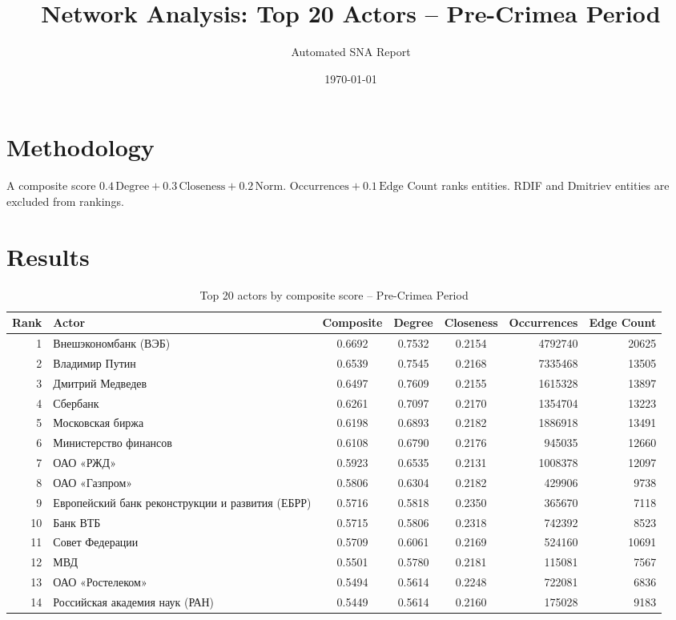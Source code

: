 \documentclass[11pt,a4paper]{article}
\title{Network Analysis: Top 20 Actors -- Pre-Crimea Period}
\author{Automated SNA Report}
\date{\today}
\begin{document}
\maketitle
\section{Methodology}
A composite score $0.4\,\text{Degree}+0.3\,\text{Closeness}+0.2\,\text{Norm.\ Occurrences}+0.1\,\text{Edge Count}$ ranks entities. RDIF and Dmitriev entities are excluded from rankings.
\section{Results}
\begin{table}[htbp]
\centering
\caption{Top 20 actors by composite score -- Pre-Crimea Period}
\label{tab:top20}
\begin{tabular}{r l S[table-format=1.4] S[table-format=1.4] S[table-format=1.4] r r}
\toprule
Rank & Actor & {Composite} & {Degree} & {Closeness} & Occurrences & {Edge Count}\\
 & Внешэкономбанк (ВЭБ) & 0.6692 & 0.7532 & 0.2154 & 4792740 & 20625 \\
2 & Владимир Путин & 0.6539 & 0.7545 & 0.2168 & 7335468 & 13505 \\
3 & Дмитрий Медведев & 0.6497 & 0.7609 & 0.2155 & 1615328 & 13897 \\
4 & Сбербанк & 0.6261 & 0.7097 & 0.2170 & 1354704 & 13223 \\
5 & Московская биржа & 0.6198 & 0.6893 & 0.2182 & 1886918 & 13491 \\
6 & Министерство финансов & 0.6108 & 0.6790 & 0.2176 & 945035 & 12660 \\
7 & ОАО «РЖД» & 0.5923 & 0.6535 & 0.2131 & 1008378 & 12097 \\
8 & ОАО «Газпром» & 0.5806 & 0.6304 & 0.2182 & 429906 & 9738 \\
9 & Европейский банк реконструкции и развития (ЕБРР) & 0.5716 & 0.5818 & 0.2350 & 365670 & 7118 \\
10 & Банк ВТБ & 0.5715 & 0.5806 & 0.2318 & 742392 & 8523 \\
11 & Совет Федерации & 0.5709 & 0.6061 & 0.2169 & 524160 & 10691 \\
12 & МВД & 0.5501 & 0.5780 & 0.2181 & 115081 & 7567 \\
13 & ОАО «Ростелеком» & 0.5494 & 0.5614 & 0.2248 & 722081 & 6836 \\
14 & Российская академия наук (РАН) & 0.5449 & 0.5614 & 0.2160 & 175028 & 9183 \\

\end{tabular}
\end{table}
\end{document}
